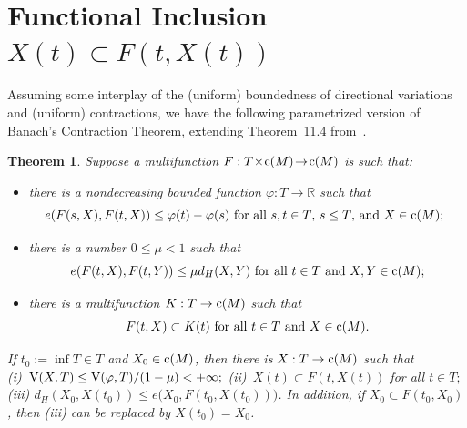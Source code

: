 \documentclass[preprint,12pt]{elsarticle}
\newtheorem{thm}{Theorem}
\newcommand{\Rb}{\mathbb{R}}  \newcommand{\Nb}{\mathbb{N}}
\newcommand{\nV}{\mbox{\rm V}}
\begin{document}
\section{Functional Inclusion $X(t)\subset F(t,X(t))$} \label{s:Func_Em}

Assuming some interplay of the (uniform) boundedness of directional variations and
(uniform) contractions, we have the following parametrized version of Banach's
Contraction Theorem, extending Theorem~11.4 from~\cite{Sovae}.

\begin{thm} \label{t:FuEm}
Suppose a multifunction $F:T\!\times\!\mbox{\rm c}(M)\!\to\!\mbox{\rm c}(M)$
is such that\/{\rm:}
  \begin{itemize}
\item[{\rm(a)}] there is a nondecreasing bounded function $\varphi:T\to\Rb$ such that
  \begin{equation*}
\mbox{$\!\!\!e(F(s,X),F(t,X))\le\varphi(t)-\varphi(s)$ for all $s,t\in T$, $s\le T$, and
  $X\in\mbox{\rm c}(M);$}
  \end{equation*}
\item[{\rm(b)}] there is a number $0\le\mu<1$ such that
  \begin{equation*}
\mbox{$e(F(t,X),F(t,Y))\le\mu d_H(X,Y)$ for all $t\in T$ and $X,Y\in\mbox{\rm c}(M);$}
  \end{equation*}
\item[{\rm(c)}] there is a multifunction $K:T\to\mbox{\rm c}(M)$ such that
  \begin{equation*}
\mbox{$F(t,X)\subset K(t)$ for all $t\in T$ and $X\in\mbox{\rm c}(M)$.}
  \end{equation*}
  \end{itemize}

If $t_0:=\inf T\in T$ and $X_0\in\mbox{\rm c}(M)$, then there is
$X:T\to\mbox{\rm c}(M)$ such that\\[3pt]
{\rm(i)}~$\nV(X,T)\le\nV(\varphi,T)/(1-\mu)<+\infty;$
{\rm(ii)}~$X(t)\subset F(t,X(t))$ for all $t\in T;$\\[3pt]
{\rm(iii)} $d_H(X_0,X(t_0))\le e\bigl(X_0,F(t_0,X(t_0))\bigr)$.
\smallbreak
In addition, if $X_0\subset F(t_0,X_0)$, then {\rm(iii)} can be replaced by $X(t_0)=X_0$.
\end{thm}
\end{document}
